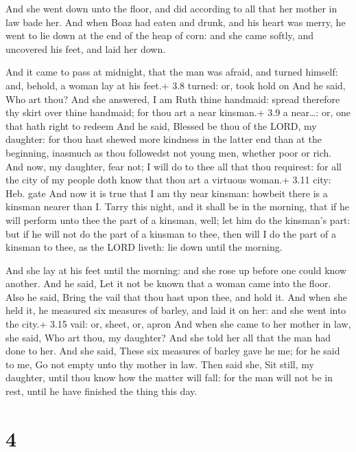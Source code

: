  And she went down unto the floor, and did according to
all that her mother in law bade her.  And when Boaz had
eaten and drunk, and his heart was merry, he went to lie down at the end
of the heap of corn: and she came softly, and uncovered his feet, and
laid her down.

 And it came to pass at midnight, that the man was afraid,
and turned himself: and, behold, a woman lay at his feet.+ 3.8 turned:
or, took hold on  And he said, Who art thou? And she
answered, I am Ruth thine handmaid: spread therefore thy skirt over
thine handmaid; for thou art a near kinsman.+ 3.9 a near\ldots: or, one
that hath right to redeem  And he said, Blessed be thou of
the LORD, my daughter: for thou hast shewed more kindness in the latter
end than at the beginning, inasmuch as thou followedst not young men,
whether poor or rich.  And now, my daughter, fear not; I
will do to thee all that thou requirest: for all the city of my people
doth know that thou art a virtuous woman.+ 3.11 city: Heb. gate
 And now it is true that I am thy near kinsman: howbeit
there is a kinsman nearer than I.  Tarry this night, and it
shall be in the morning, that if he will perform unto thee the part of a
kinsman, well; let him do the kinsman's part: but if he will not do the
part of a kinsman to thee, then will I do the part of a kinsman to thee,
as the LORD liveth: lie down until the morning.

 And she lay at his feet until the morning: and she rose
up before one could know another. And he said, Let it not be known that
a woman came into the floor.  Also he said, Bring the vail
that thou hast upon thee, and hold it. And when she held it, he measured
six measures of barley, and laid it on her: and she went into the city.+
3.15 vail: or, sheet, or, apron  And when she came to her
mother in law, she said, Who art thou, my daughter? And she told her all
that the man had done to her.  And she said, These six
measures of barley gave he me; for he said to me, Go not empty unto thy
mother in law.  Then said she, Sit still, my daughter,
until thou know how the matter will fall: for the man will not be in
rest, until he have finished the thing this day.

\hypertarget{section-3}{%
\section{4}\label{section-3}}

